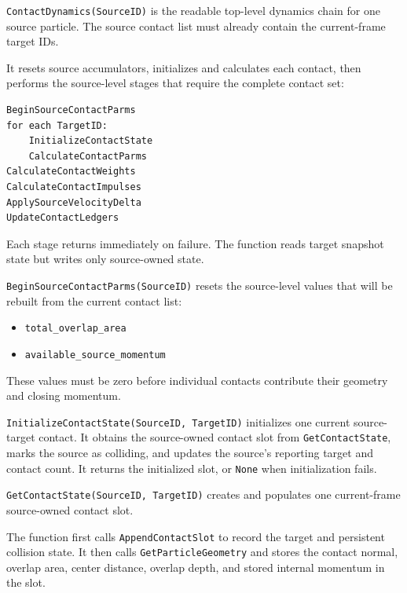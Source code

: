 
\texttt{ContactDynamics(SourceID)} is the readable top-level dynamics chain for
one source particle.  The source contact list must already contain the
current-frame target IDs.

It resets source accumulators, initializes and calculates each contact, then
performs the source-level stages that require the complete contact set:

\begin{verbatim}
BeginSourceContactParms
for each TargetID:
    InitializeContactState
    CalculateContactParms
CalculateContactWeights
CalculateContactImpulses
ApplySourceVelocityDelta
UpdateContactLedgers
\end{verbatim}

Each stage returns immediately on failure.  The function reads target snapshot
state but writes only source-owned state.


\texttt{BeginSourceContactParms(SourceID)} resets the source-level values that
will be rebuilt from the current contact list:

\begin{itemize}
    \item \texttt{total\_overlap\_area}
    \item \texttt{available\_source\_momentum}
\end{itemize}

These values must be zero before individual contacts contribute their geometry
and closing momentum.


\texttt{InitializeContactState(SourceID, TargetID)} initializes one current
source-target contact.  It obtains the source-owned contact slot from
\texttt{GetContactState}, marks the source as colliding, and updates the
source's reporting target and contact count.  It returns the initialized slot,
or \texttt{None} when initialization fails.


\texttt{GetContactState(SourceID, TargetID)} creates and populates one
current-frame source-owned contact slot.

The function first calls \texttt{AppendContactSlot} to record the target and
persistent collision state.  It then calls \texttt{GetParticleGeometry} and
stores the contact normal, overlap area, center distance, overlap depth, and
stored internal momentum in the slot.


